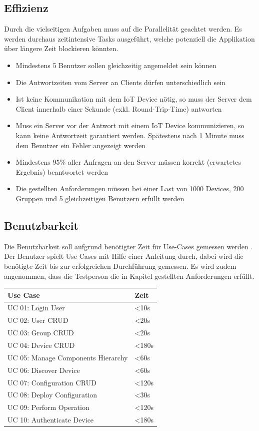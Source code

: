 \subsection{Effizienz}
Durch die vielseitigen Aufgaben muss auf die Parallelität geachtet werden. Es werden durchaus zeitintensive Tasks ausgeführt, welche potenziell die Applikation über längere Zeit blockieren könnten.

\begin{itemize}
\item Mindestens 5 Benutzer sollen gleichzeitig angemeldet sein können
\item Die Antwortzeiten vom Server an Clients dürfen unterschiedlich sein  
\item Ist keine Kommunikation mit dem IoT Device nötig, so muss der Server dem Client innerhalb einer Sekunde (exkl. Round-Trip-Time) antworten
\item Muss ein Server vor der Antwort mit einem IoT Device kommunizieren, so kann keine Antwortzeit garantiert werden. Spätestens nach 1 Minute muss dem Benutzer ein Fehler angezeigt werden
\item Mindestens 95\% aller Anfragen an den Server müssen korrekt (erwartetes Ergebnis) beantwortet werden
\item Die gestellten Anforderungen müssen bei einer Last von 1000 Devices, 200 Gruppen und 5 gleichzeitigen Benutzern erfüllt werden
\end{itemize}
\newpage
\subsection{Benutzbarkeit}
Die Benutzbarkeit soll aufgrund benötigter Zeit für Use-Cases gemessen werden \cite{ReinhardSteiner}. Der Benutzer spielt Use Cases mit Hilfe einer Anleitung durch, dabei wird die benötigte Zeit bis zur erfolgreichen Durchführung gemessen. Es wird zudem angenommen, dass die Testperson die in Kapitel gestellten Anforderungen erfüllt.

\begin{center}
\begin{longtable}{| p{8cm} | p{2.5cm} |}
\hline
\textbf{Use Case} 						& \textbf{Zeit}\\ \hline
UC 01: Login User    					& <10s \\ \hline
UC 02: User CRUD			 			& <20s \\ \hline
UC 03: Group CRUD	         			& <20s \\ \hline 
UC 04: Device CRUD               		& <180s \\ \hline 
UC 05: Manage Components Hierarchy		& <60s \\ \hline 
UC 06: Discover Device     				& <60s \\ \hline
UC 07: Configuration CRUD			 	& <120s \\ \hline
UC 08: Deploy Configuration				& <30s \\ \hline
UC 09: Perform Operation			 	& <120s \\ \hline
UC 10: Authenticate Device	 			& <180s \\ \hline
\end{longtable}
\end{center}
